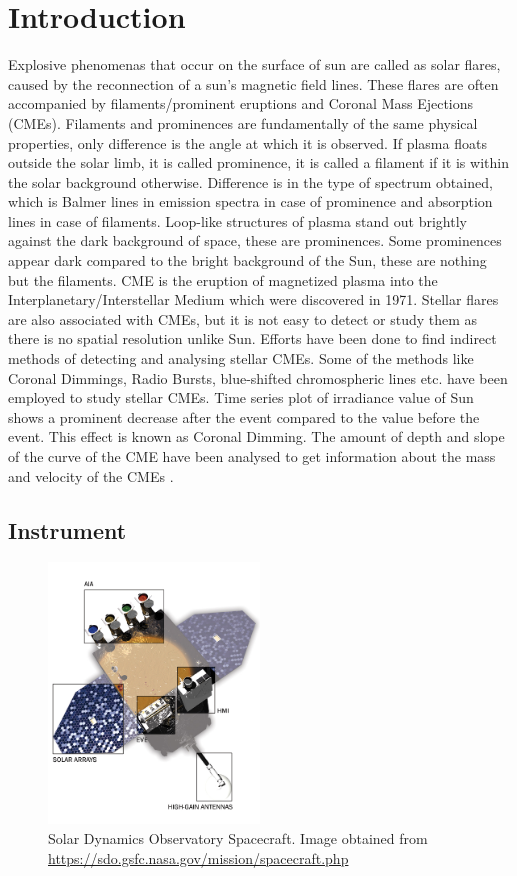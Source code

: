 \section{Introduction}

Explosive phenomenas that occur on the surface of sun are called as solar flares, caused by the reconnection of a sun's magnetic field lines. These flares are often accompanied by filaments/prominent eruptions and Coronal Mass Ejections (CMEs). Filaments and prominences are fundamentally of the same physical properties, only difference is the angle at which it is observed. If plasma floats outside the solar limb, it is called prominence, it is called a filament if it is within the solar background otherwise. Difference is in the type of spectrum obtained, which is Balmer lines in emission spectra in case of prominence and absorption lines in case of filaments. Loop-like structures of plasma stand out brightly against the dark background of space, these are prominences. Some prominences appear dark compared to the bright background of the Sun, these are nothing but the filaments. CME is the eruption of magnetized plasma into the Interplanetary/Interstellar Medium which were discovered in 1971. Stellar flares are also associated with CMEs, but it is not easy to detect or study them as there is no spatial resolution unlike Sun. Efforts have been done to find indirect methods of detecting and analysing stellar CMEs. Some of the methods like Coronal Dimmings, Radio Bursts, blue-shifted chromospheric lines etc. have been employed to study stellar CMEs. Time series plot of irradiance value of Sun shows a prominent decrease after the event compared to the value before the event. This effect is known as Coronal Dimming. The amount of depth and slope of the curve of the CME have been analysed to get information about the mass and velocity of the CMEs \citep{Mason2016}.

\subsection{Instrument}

\begin{figure}[ht]
    \centering
    \includegraphics[width=0.5\textwidth]{images/spacecraft_detailed.jpg}
    \caption{Solar Dynamics Observatory Spacecraft.
      Image obtained from {\url{https://sdo.gsfc.nasa.gov/mission/spacecraft.php}}}
    \label{fig:label}
\end{figure}

